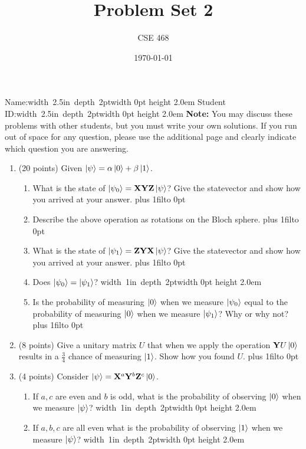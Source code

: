 \documentclass[12pt]{article}
\title{Problem Set 2}
\author{CSE 468}
\date{\today}
\newcommand{\Blank}{\mbox{\hskip 4pt\vrule width 1in depth 2pt}\vrule width 0pt height 2.0em}
\newcommand{\NameBlank}{\mbox{\hskip 4pt\vrule width 2.5in depth 2pt}\vrule width 0pt height 2.0em}
\def\DefaultSpace{1in}
\newcommand{\LeaveSpace}[1][\DefaultSpace]{%
\vskip #1 plus 1fil\relax\hbox to 0pt{\hss} %
}
\begin{document}
\maketitle

\noindent Name:\NameBlank{} \newline
\noindent Student ID:\NameBlank{} \newline
\textbf{Note:} You may discuss these problems with other students, but you must write your own solutions. If you run out of space for any question, please use the additional page and clearly indicate which question you are answering.
\begin{enumerate}[font=\bfseries]
    \item (20 points) Given $\ket{\psi} = \alpha\ket{0} + \beta\ket{1}$.
    \begin{enumerate}
        \item What is the state of $\ket{\psi_0} = \mathbf{X}\mathbf{Y}\mathbf{Z}\ket{\psi}$? Give the statevector and show how you arrived at your answer. \LeaveSpace[0.4in]
        \item Describe the above operation as rotations on the Bloch sphere.\LeaveSpace{}
        \item What is the state of $\ket{\psi_1} = \mathbf{Z}\mathbf{Y}\mathbf{X}\ket{\psi}$? Give the statevector and show how you arrived at your answer. \LeaveSpace[0.4in]
        \item Does $\ket{\psi_0} = \ket{\psi_1}$? \Blank{}
        \item Is the probability of measuring $\ket{0}$ when we measure $\ket{\psi_0}$ equal to the probability of measuring $\ket{0}$ when we measure $\ket{\psi_1}$? Why or why not?\LeaveSpace{}
    \end{enumerate}
    \item (8 points) Give a unitary matrix $U$ that when we apply the operation $\mathbf{Y}U\ket{0}$ results in a $\frac{3}{4}$ chance of measuring $\ket{1}$. Show how you found $U$. \LeaveSpace[2.0in]
    \item (4 points) Consider $\ket{\psi} = \mathbf{X}^a\mathbf{Y}^b\mathbf{Z}^c\ket{0}$.
    \begin{enumerate}
        \item If $a,c$ are even and $b$ is odd, what is the probability of observing $\ket{0}$ when we measure $\ket{\psi}$? \Blank{}
        \item If $a,b,c$ are all even what is the probability of observing $\ket{1}$ when we measure $\ket{\psi}$? \Blank{}
    \end{enumerate}

\end{enumerate}
\end{document}
